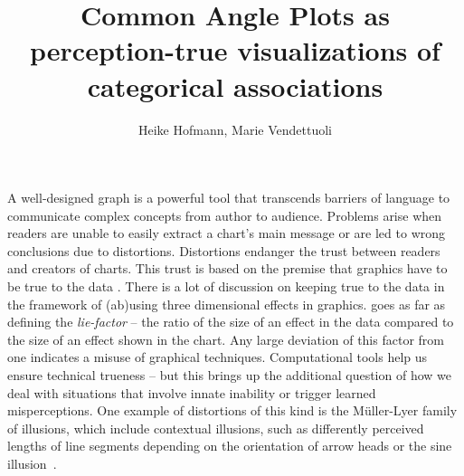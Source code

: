\documentclass[journal]{vgtc}\usepackage{graphicx, color}
\title{Common Angle Plots as perception-true visualizations of categorical associations}
\author{Heike Hofmann, Marie Vendettuoli}
\begin{document}


\maketitle



% 
% 
% 
% 
A well-designed graph is a powerful tool 
that transcends barriers of language to
communicate complex concepts from author to audience. 
Problems arise when readers are unable to easily extract a chart's main message or are led to wrong conclusions due to distortions.
Distortions endanger the trust between readers and creators of charts. This trust is based on the  premise that
graphics have to be true to the data \citep{tufte, wainer:2000, robbins:2005}.
There is a lot of discussion on keeping true to the data in the framework of (ab)using three dimensional effects in graphics. \citet{tufte} goes as far as defining the {\it lie-factor} -- the ratio of the size of an effect in the data compared to the size of an effect shown in the chart. Any large deviation of this factor from one indicates a misuse of graphical techniques. Computational tools help us ensure technical trueness -- but this brings up the additional question of how we deal with situations that involve innate inability or trigger learned misperceptions.
One example of distortions of this kind is the 
 M\"{u}ller-Lyer family of illusions, which include contextual illusions,  such as differently perceived lengths of line segments depending on the orientation of arrow heads  
 or the sine illusion~\citep{day:1991}.
\end{document}

